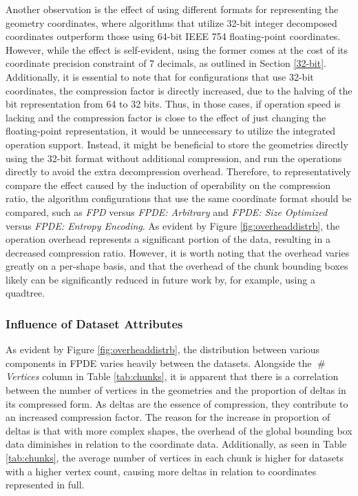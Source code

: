 Another observation is the effect of using different formats for representing the geometry coordinates, where algorithms that utilize 32-bit integer decomposed coordinates outperform those using 64-bit IEEE 754 floating-point coordinates. However, while the effect is self-evident, using the former comes at the cost of its coordinate precision constraint of 7 decimals, as outlined in Section \ref{32-bit}. Additionally, it is essential to note that for configurations that use 32-bit  coordinates, the compression factor is directly increased, due to the halving of the bit representation from 64 to 32 bits.  Thus, in those cases, if operation speed is lacking and the compression factor is close to the effect of just changing the floating-point representation, it would be unnecessary to utilize the integrated operation support. Instead, it might be beneficial to store the geometries directly using the 32-bit format without additional compression, and run the operations directly to avoid the extra decompression overhead. Therefore, to representatively compare the effect caused by the induction of operability on the compression ratio, the algorithm configurations that use the same coordinate format should be compared, such as \emph{FPD} versus \emph{FPDE: Arbitrary} and \emph{FPDE: Size Optimized} versus \emph{FPDE: Entropy Encoding}. As evident by Figure \ref{fig:overheaddistrb}, the operation overhead represents a significant portion of the data, resulting in a decreased compression ratio. However, it is worth noting that the overhead varies greatly on a per-shape basis, and that the overhead of the chunk bounding boxes likely can be significantly reduced in future work by, for example, using a quadtree.

\subsubsection{Influence of Dataset Attributes}
As evident by Figure \ref{fig:overheaddistrb}, the distribution between various components in FPDE varies heavily between the datasets. Alongside the \textit{$\mathrel\#$ Vertices} column in Table \ref{tab:chunks}, it is apparent that there is a correlation between the number of vertices in the geometries and the proportion of deltas in its compressed form. As deltas are the essence of compression, they contribute to an increased compression factor. The reason for the increase in proportion of deltas is that with more complex shapes, the overhead of the global bounding box data diminishes in relation to the coordinate data. Additionally, as seen in Table \ref{tab:chunks}, the average number of vertices in each chunk is higher for datasets with a higher vertex count, causing more deltas in relation to coordinates represented in full. 

